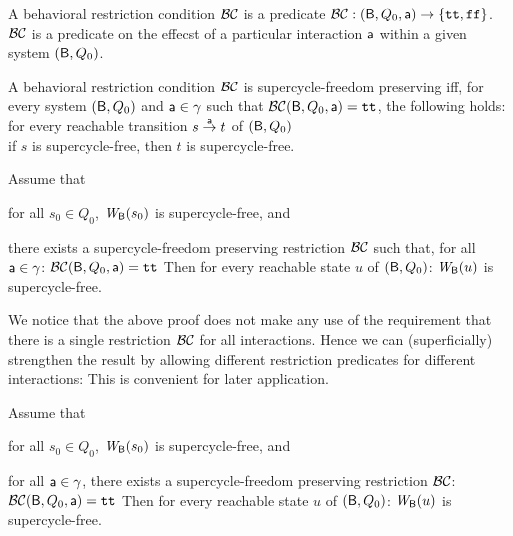 \bd
A behavioral restriction condition $\BC$ is a predicate $\BC: (\B, Q_0, \act) \to \set{\ttt, \fff}$. 
\ed
$\BC$ is a predicate on the effecst of a particular interaction $\act$ within a given system $(\B, Q_0)$.

 \label{def:SC-free-preserving}
A behavioral restriction condition $\BC$ is supercycle-freedom preserving iff, for every system 
$(\B, Q_0)$ and $\act \in \gamma$ such that $\BC(\B, Q_0, \act) = \ttt$, the following holds:\\[2ex]
%
\ind \ind for every reachable transition $s \goesto[\act] t$ of $(\B, Q_0)$\\
\ind \ind \ind if $s$ is supercycle-free, then $t$ is supercycle-free.
\ed


\label{theorem:SC-free-preserving.deadlock-free}
Assume that
\bn
\item \label{theorem:SC-free-preserving.initial}
      for all $s_0 \in Q_0$, $\wfg{\B}{s_0}$ is supercycle-free, and
\item \label{theorem:SC-free-preserving.reachable-transitions}
   there exists a supercycle-freedom preserving restriction $\BC$ such that,
   for all $\act \in \gamma$: $\BC(\B, Q_0, \act) = \ttt$ 
\en
Then for every reachable state $u$ of $(\B, Q_0)$:  $\wfg{\B}{u}$ is supercycle-free.
\et
{}

We notice that the above proof does not make any use of the requirement that there is a single restriction $\BC$ for all
interactions. Hence we can (superficially) strengthen the result by allowing different restriction predicates for different interactions:
This is convenient for later application. 



\label{cor:SC-free-preserving.deadlock-free}
Assume that
\bn
\item \label{cor:SC-free-preserving.initial}
      for all $s_0 \in Q_0$, $\wfg{\B}{s_0}$ is supercycle-free, and
\item \label{cor:SC-free-preserving.reachable-transitions}
   for all $\act \in \gamma$, there exists a supercycle-freedom preserving restriction $\BC$: $\BC(\B, Q_0, \act) = \ttt$ 
\en
Then for every reachable state $u$ of $(\B, Q_0)$:  $\wfg{\B}{u}$ is supercycle-free.
\eco
{}
